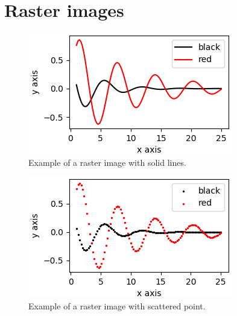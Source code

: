 \documentclass[aps, prb, twocolumn, superscriptaddress, amsmath, amssymb]{revtex4-2}
\begin{document}
\section{Raster images}
\lipsum[1]

\begin{figure}
	\centering
	\includegraphics{raster_solid}
	\caption{Example of a raster image with solid lines.}
	\label{vector_solid}
\end{figure}

\lipsum[2]

\begin{figure}
	\centering
	\includegraphics{raster_scatter}
	\caption{Example of a raster image with scattered point.}
	\label{vector_scatter}
\end{figure}


% 
\end{document}
